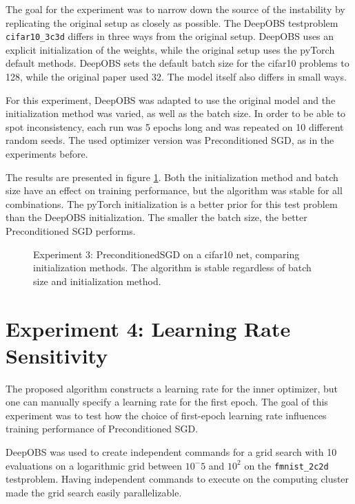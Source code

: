 \documentclass[twoside,12pt,a4paper]{report}
\begin{document}
The goal for the experiment was to narrow down the source of the instability by replicating the original setup as closely as possible. The DeepOBS testproblem \verb|cifar10_3c3d| differs in three ways from the original setup. DeepOBS uses an explicit initialization of the weights, while the original setup uses the pyTorch default methods. DeepOBS sets the default batch size for the cifar10 problems to 128, while the original paper used 32. The model itself also differs in small ways.

For this experiment, DeepOBS was adapted to use the original model and the initialization method was varied, as well as the batch size. In order to be able to spot inconsistency, each run was 5 epochs long and was repeated on 10 different random seeds. The used optimizer version was Preconditioned SGD, as in the experiments before.

The results are presented in figure \ref{fig:exp_init}. Both the initialization method and batch size have an effect on training performance, but the algorithm was stable for all combinations. The pyTorch initialization is a better prior for this test problem than the DeepOBS initialization. The smaller the batch size, the better Preconditioned SGD performs.

\begin{figure}
	\centering \hspace{-1,5cm}
	
	\caption{Experiment 3: PreconditionedSGD on a cifar10 net, comparing initialization methods. The algorithm is stable regardless of batch size and initialization method.}
	\label{fig:exp_init}
\end{figure}


\section{Experiment 4: Learning Rate Sensitivity}
The proposed algorithm constructs a learning rate for the inner optimizer, but one can manually specify a learning rate for the first epoch.
The goal of this experiment was to test how the choice of first-epoch learning rate influences training performance of Preconditioned SGD.

DeepOBS was used to create independent commands for a grid search with 10 evaluations on a logarithmic grid between $10^-5$ and $10^2$ on the \verb|fmnist_2c2d| testproblem. Having independent commands to execute on the computing cluster made the grid search easily parallelizable.
\end{document}
